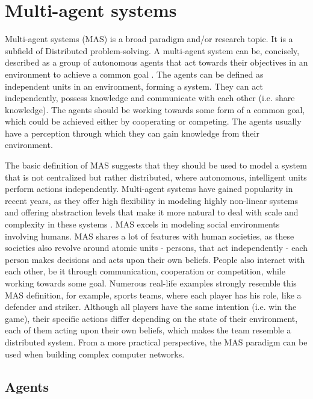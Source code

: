 \documentclass[0main.tex]{subfiles}
\begin{document}
\section{Multi-agent systems} \label{sec-mas}

Multi-agent systems (MAS) is a broad paradigm and/or research topic. It is a subfield of Distributed
problem-solving. A multi-agent system can be, concisely, described as a group
of autonomous agents that act towards their objectives in an environment to achieve a common goal
\cite{ParasumannaGokulan2010}. The agents can be defined as independent units in
an environment, forming a system. They can act independently, possess
knowledge and communicate with each other (i.e. share knowledge). The agents
should be working towards some form of a common goal, which could be achieved
either by cooperating or competing.  The agents usually have a perception
through which they can gain knowledge from their environment.

The basic definition of MAS suggests that they should be used to model
a system that is not centralized but rather distributed, where autonomous, intelligent units perform
actions independently. Multi-agent systems have gained popularity in recent years, as they
offer high flexibility in modeling highly non-linear systems and offering abstraction levels that
make it more natural to deal with scale and complexity in these systems
\cite{Burmeister1997ApplicationOM}. MAS excels in modeling social environments
involving humans. MAS shares a lot of features with human societies, as these societies also revolve
around atomic units - persons, that act independently - each person makes decisions and acts upon
their own beliefs. People also interact with each other, be it through communication, cooperation or
competition, while working towards some goal. Numerous real-life examples strongly
resemble this MAS definition, for example, sports teams, where each player has his role, like
a defender and striker. Although all players have the same intention (i.e. win the game), their
specific actions differ depending on the state of their environment, each of them acting upon their
own beliefs, which makes the team resemble a distributed system. From a more practical perspective,
the MAS paradigm can be used when building complex computer networks.

\subsection{Agents}
\end{document}
